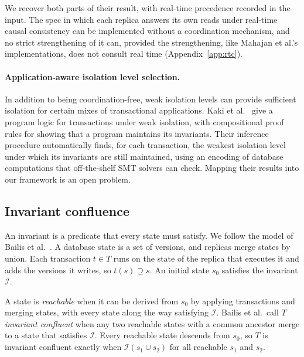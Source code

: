 We recover both parts of their result, with real-time precedence recorded in
the input.  The spec in which each replica answers its own reads under
real-time causal consistency can be implemented without a coordination
mechanism, and no strict strengthening of it can, provided the strengthening,
like Mahajan et al.'s implementations, does not consult real time
(Appendix~\ref{app:rtc}).

\paragraph{Application-aware isolation level selection.}
In addition to being coordination-free, weak isolation levels can provide
sufficient isolation for certain mixes of transactional applications.  Kaki et
al.~\cite{kaki2018alone} give a program logic for transactions under weak
isolation, with compositional proof rules for showing that a program maintains
its invariants.  Their inference procedure automatically finds, for each
transaction, the weakest isolation level under which its invariants are still
maintained, using an encoding of database computations that off-the-shelf SMT
solvers can check.  Mapping their results into our framework is an open
problem.

\subsection{Invariant confluence}
\label{sec:iconfluence-instance}

An invariant is a predicate that every state must satisfy.  We follow the model
of Bailis et al.~\cite{bailis2014coordination}.  A database state is a set of
versions, and replicas merge states by union.  Each transaction $t\in T$ runs
on the state of the replica that executes it and adds the versions it writes,
so $t(s)\supseteq s$.  An initial state $s_0$ satisfies the invariant
$\mathcal I$.

A state is \emph{reachable} when it can be derived from $s_0$ by applying
transactions and merging states, with every state along the way satisfying
$\mathcal I$.  Bailis et al.\ call $T$ \emph{invariant confluent} when any two
reachable states with a common ancestor merge to a state that satisfies
$\mathcal I$.  Every reachable state descends from $s_0$, so $T$ is invariant
confluent exactly when $\mathcal I(s_1\cup s_2)$ for all
reachable $s_1$ and $s_2$.

